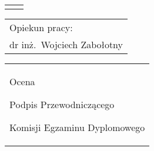 \begin{titlepage}
{\begin{center}
	\vspace*{7\baselineskip}
	\hfill\mbox{}\par\vspace*{\baselineskip}\noindent
	\begin{tabular}[b]{@{}p{3cm}@{\ }l@{}}
	    {\large\hfill } & {\large }
	\end{tabular}
	\hfill
	\begin{tabular}[b]{@{}l@{}}
	Opiekun pracy: \\[\smallskipamount]
	{\large dr inż.\ Wojciech Zabołotny}
	\end{tabular}\par
	\vspace*{4\baselineskip}
    \begin{tabular}{p{\textwidth}}
    \begin{flushleft}
	\begin{minipage}{7cm}
	Ocena \dotfill
	\par\vspace{1.6\baselineskip}
	\dotfill
	\par\noindent
	\centerline{\footnotesize Podpis Przewodniczącego} \par
	\centerline{\footnotesize Komisji Egzaminu Dyplomowego}\par
	\end{minipage}
    \end{flushleft}
    \end{tabular}
    \end{center}}


\end{titlepage}
